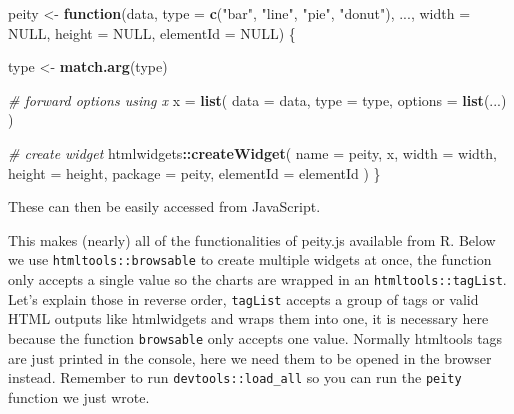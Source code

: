 \documentclass[
]{krantz}
\makeatletter
\newenvironment{Shaded}{\begin{snugshade}}{\end{snugshade}}
\newcommand{\AttributeTok}[1]{\textcolor[rgb]{0.61,0.61,0.61}{#1}}
\newcommand{\CommentTok}[1]{\textcolor[rgb]{0.37,0.37,0.37}{\textit{#1}}}
\newcommand{\ControlFlowTok}[1]{\textcolor[rgb]{0.27,0.27,0.27}{\textbf{#1}}}
\newcommand{\DataTypeTok}[1]{\textcolor[rgb]{0.27,0.27,0.27}{#1}}
\newcommand{\KeywordTok}[1]{\textcolor[rgb]{0.27,0.27,0.27}{\textbf{#1}}}
\newcommand{\NormalTok}[1]{#1}
\newcommand{\OperatorTok}[1]{\textcolor[rgb]{0.43,0.43,0.43}{\textbf{#1}}}
\newcommand{\OtherTok}[1]{\textcolor[rgb]{0.37,0.37,0.37}{#1}}
\newcommand{\StringTok}[1]{\textcolor[rgb]{0.5,0.5,0.5}{#1}}
\newcommand{\VariableTok}[1]{\textcolor[rgb]{0,0,0}{#1}}
\newenvironment{kframe}{%
\medskip{}
\setlength{\fboxsep}{.8em}
 \def\at@end@of@kframe{}%
 \ifinner\ifhmode%
  \def\at@end@of@kframe{\end{minipage}}%
  \begin{minipage}{\columnwidth}%
 \fi\fi%
 \def\FrameCommand##1{\hskip\@totalleftmargin \hskip-\fboxsep
 \colorbox{shadecolor}{##1}\hskip-\fboxsep
     \hskip-\linewidth \hskip-\@totalleftmargin \hskip\columnwidth}%
 \MakeFramed {\advance\hsize-\width
   \@totalleftmargin\z@ \linewidth\hsize
   \@setminipage}}%
 {\par\unskip\endMakeFramed%
 \at@end@of@kframe}
\renewenvironment{Shaded}{\begin{kframe}}{\end{kframe}}
\makeatother
\begin{document}
\begin{Shaded}
\begin{Highlighting}[]
\NormalTok{peity <{-}}\StringTok{ }\ControlFlowTok{function}\NormalTok{(data, }\DataTypeTok{type =} \KeywordTok{c}\NormalTok{(}\StringTok{"bar"}\NormalTok{, }\StringTok{"line"}\NormalTok{, }\StringTok{"pie"}\NormalTok{, }\StringTok{"donut"}\NormalTok{), ...,}
  \DataTypeTok{width =} \OtherTok{NULL}\NormalTok{, }\DataTypeTok{height =} \OtherTok{NULL}\NormalTok{, }\DataTypeTok{elementId =} \OtherTok{NULL}\NormalTok{) \{}

\NormalTok{  type <{-}}\StringTok{ }\KeywordTok{match.arg}\NormalTok{(type)}

  \CommentTok{\# forward options using x}
\NormalTok{  x =}\StringTok{ }\KeywordTok{list}\NormalTok{(}
    \DataTypeTok{data =}\NormalTok{ data,}
    \DataTypeTok{type =}\NormalTok{ type,}
    \DataTypeTok{options =} \KeywordTok{list}\NormalTok{(...)}
\NormalTok{  )}

  \CommentTok{\# create widget}
\NormalTok{  htmlwidgets}\OperatorTok{::}\KeywordTok{createWidget}\NormalTok{(}
    \DataTypeTok{name =} \StringTok{\textquotesingle{}peity\textquotesingle{}}\NormalTok{,}
\NormalTok{    x,}
    \DataTypeTok{width =}\NormalTok{ width,}
    \DataTypeTok{height =}\NormalTok{ height,}
    \DataTypeTok{package =} \StringTok{\textquotesingle{}peity\textquotesingle{}}\NormalTok{,}
    \DataTypeTok{elementId =}\NormalTok{ elementId}
\NormalTok{  )}
\NormalTok{\}}
\end{Highlighting}
\end{Shaded}

These can then be easily accessed from JavaScript.

\begin{Shaded}
\end{Shaded}

This makes (nearly) all of the functionalities of peity.js available from R. Below we use \texttt{htmltools::browsable} to create multiple widgets at once, the function only accepts a single value so the charts are wrapped in an \texttt{htmltools::tagList}. Let's explain those in reverse order, \texttt{tagList} accepts a group of tags or valid HTML outputs like htmlwidgets and wraps them into one, it is necessary here because the function \texttt{browsable} only accepts one value. Normally htmltools tags are just printed in the console, here we need them to be opened in the browser instead. Remember to run \texttt{devtools::load\_all} so you can run the \texttt{peity} function we just wrote.
\end{document}
